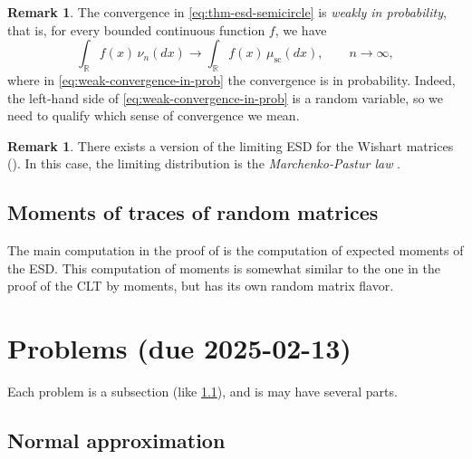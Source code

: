 \documentclass[letterpaper,11pt,oneside,reqno]{article}
\numberwithin{equation}{section}
\theoremstyle{definition}
\newtheorem{remark}[proposition]{Remark}
\begin{document}
\begin{remark}
	The convergence in \eqref{eq:thm-esd-semicircle} is
	\emph{weakly in probability}, that is,
	for every bounded continuous function $f$,
	we have
	\begin{equation}
		\label{eq:weak-convergence-in-prob}
		\int_{\mathbb{R}} f(x) \, \nu_n(dx) \longrightarrow \int_{\mathbb{R}} f(x) \, \mu_{\mathrm{sc}}(dx),\qquad  n\to\infty,
	\end{equation}
	where in \eqref{eq:weak-convergence-in-prob} the convergence is in probability.
	Indeed, the left-hand side of \eqref{eq:weak-convergence-in-prob}
	is a random variable, so we need to qualify which sense of convergence we mean.
\end{remark}

\begin{remark}
	There exists a version of the limiting
	ESD for the Wishart matrices
	().
	In this case, the limiting distribution is the
	\emph{Marchenko-Pastur law}
	\cite{MarchenkoPastur}.
\end{remark}

\subsection{Moments of traces of random matrices}

The main computation in the proof of
 is the computation of
expected moments of the ESD.
This computation of moments is somewhat similar
to the one in the proof of the CLT by moments,
but has its own random matrix flavor.












\newpage
\appendix
\setcounter{section}{0}

\section{Problems (due 2025-02-13)}

Each problem is a subsection (like \ref{sub:normal-approximation}),
and is may have several parts.

\subsection{Normal approximation}
\label{sub:normal-approximation}
\end{document}
